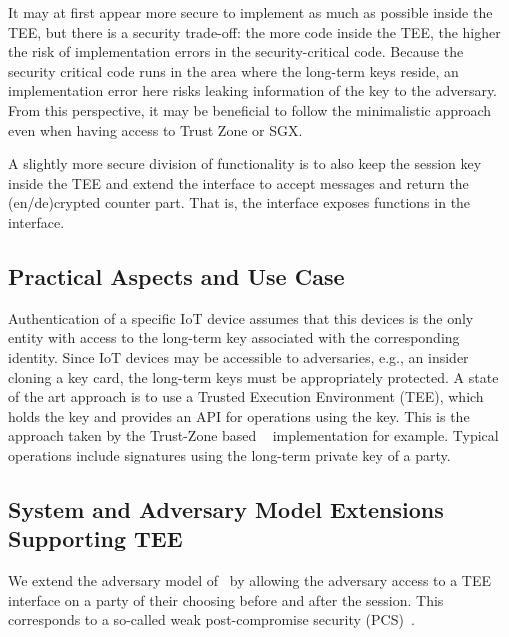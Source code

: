 \documentclass[runningheads]{llncs}
\begin{document}
It may at first appear more secure to implement as much as possible inside the
TEE, but there is a security trade-off: the more code inside the TEE,
the higher the risk of implementation errors in the security-critical code.
%
Because the security critical code runs in the area where the long-term keys
reside, an implementation error here risks leaking information of the key to the
adversary.
%
From this perspective, it may be beneficial to follow the minimalistic approach
even when having access to Trust Zone or SGX.
%

A slightly more secure division of functionality is to also keep the
session key inside
the TEE and extend the interface to accept messages and return the
(en/de)crypted counter part.
%
That is, the interface exposes \mAead{} functions in the interface.
%

\subsection{Practical Aspects and Use Case}
\label{sec:TEE:useCase}
Authentication of a specific IoT device assumes that this devices is the only
entity with access to the long-term key associated with the corresponding
identity.
%
Since IoT devices may be accessible to adversaries, e.g., an insider cloning a
key card, the long-term keys must be appropriately protected.
%
A state of the art approach is to use a Trusted Execution Environment (TEE),
which holds the key and provides an API for operations using the key.
%
This is the approach taken by the
Trust-Zone based \mMuEdhoc{}~\cite{DBLP:conf/codaspy/Hristozov0XFLS21}
implementation for example.
%
Typical operations include signatures using the long-term private key of a
party.
%

\subsection{System and Adversary Model Extensions Supporting TEE}
\label{sec:TEE:advModel}
%
We extend the adversary model of~\cite{Norr21} by allowing the adversary
access to a TEE interface on a party of their choosing before and after the
\mEdhoc{} session.
%
This corresponds to a so-called weak post-compromise security
(PCS)~\cite{DBLP:conf/csfw/Cohn-GordonCG16}.
%
\end{document}
